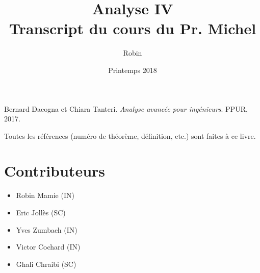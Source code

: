 \documentclass[a4paper, 11pt]{report}
\title{\textbf{Analyse IV} \\
Transcript du cours du Pr. Michel \bsc{Cibils}}
\author{Robin \bsc{Mamié}}
\date{Printemps 2018}
\theoremstyle{definition}
\theoremstyle{remark}
\begin{document}
\maketitle

\tableofcontents









\begin{thebibliography}{9}
    Bernard Dacogna et Chiara Tanteri. 
    \textit{Analyse avancée pour ingénieurs}. 
    PPUR, 2017.
\end{thebibliography}

Toutes les références (numéro de théorème, définition, etc.) sont faites à ce livre.


\section*{Contributeurs}

\begin{itemize}
    \item Robin Mamie (IN)
    \item Eric Jollès (SC)
    \item Yves Zumbach (IN)
    \item Victor Cochard (IN)
    \item Ghali Chraibi (SC)
\end{itemize}
\end{document}
